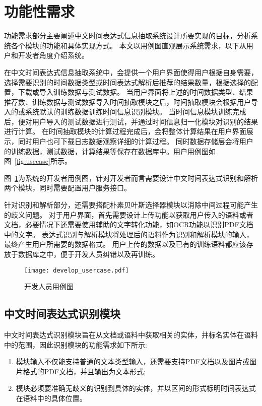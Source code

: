 \section{功能性需求}

功能需求部分主要阐述中文时间表达式信息抽取系统设计所要实现的目标，分析系统各个模块的功能和具体实现方式。
本文以用例图直观展示系统需求，以下从用户和开发者角度介绍系统。

在中文时间表达式信息抽取系统中，会提供一个用户界面使得用户根据自身需要，选择需要识别的时间数据类型或时间表达式解析后推荐的结果数量，根据选择的配置，下载或导入训练数据与测试数据。
当用户界面将上述的时间数据类型、结果推荐数、训练数据与测试数据导入时间抽取模块之后，时间抽取模块会根据用户导入的或系统默认的训练数据训练时间信息识别模块。
当时间信息模块训练完成后，便对用户导入的测试数据进行测试，并通过时间信息归一化模块对识别的结果进行计算。
在时间抽取模块的计算过程完成后，会将整体计算结果在用户界面展示，同时用户也可下载日志数据观察详细的计算过程。
同时数据存储层会将用户的训练数据，测试数据，计算结果等保存在数据库中。用户用例图如图~\ref{fig:usecase}所示。

图~\ref{fig:develope_usecase}为系统的开发者用例图，针对开发者而言需要设计中文时间表达式识别和解析两个模块，同时需要配置用户服务接口。

针对识别和解析部分，还需要搭配朴素贝叶斯选择器模块以消除中间过程可能产生的歧义问题。
对于用户界面，首先需要设计上传功能以获取用户传入的语料或者文档，必要情况下还需要使用辅助的文字转化功能，如OCR功能以识别PDF文档中的文字。
表达式识别与解析模块将处理后的语料作为识别和解析模块的输入，最终产生用户所需要的数据格式。
用户上传的数据以及已有的训练语料都应该存放于数据库之中，便于开发人员纠错以及再训练。

\begin{figure}[h]
    \centering
    \texttt{[image: develop\_usercase.pdf]}
    \caption{开发人员用例图}
    \label{fig:develope_usecase}
\end{figure}

\subsection{中文时间表达式识别模块}

中文时间表达式识别模块旨在从文档或语料中获取相关的实体，并标名实体在语料中的范围，因此识别模块的功能需求如下所示:
\begin{enumerate}
    \item[(1)] 模块输入不仅能支持普通的文本类型输入，还需要支持PDF文档以及图片或图片格式的PDF文档，并且输出为文本形式;
    \item[(2)] 模块必须要准确无歧义的识别到具体的实体，并以区间的形式标明时间表达式在语料中的具体位置。
\end{enumerate}

